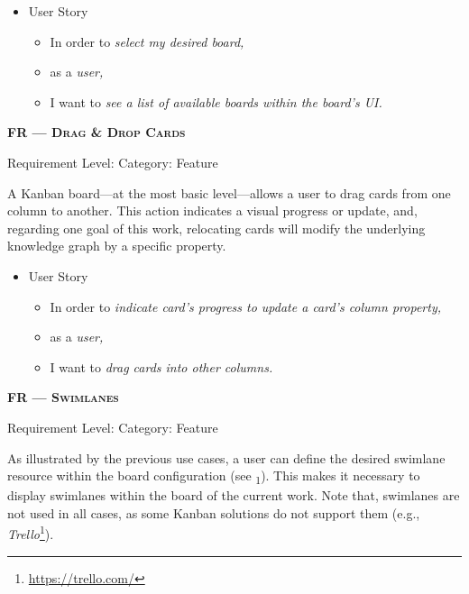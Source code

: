 \begin{itemize}[after=\vspace{1em}]
    \setlength\itemsep{-0.5em}
	\item[] User Story\\[-7.8mm]
	\begin{itemize}
    \setlength\itemsep{-0.5em}
        \item[] In order to \textit{select my desired board,}
        \item[] as a \textit{user,}
        \item[] I want to \textit{see a list of available boards within the board’s \acrshort*{UI}.}
    \end{itemize}
\end{itemize}






\centerline{\textbf{FR\textsubscript{} --- \textsc{Drag \& Drop Cards}}}

\centerline{\small Requirement Level:  \quad{} Category: Feature}

\noindent A Kanban board---at the most basic level---allows a user to drag cards from one column to another. This action indicates a visual progress or update, and, regarding one goal of this work, relocating cards will modify the underlying knowledge graph by a specific property.

\begin{itemize}[after=\vspace{1em}]
    \setlength\itemsep{-0.5em}
	\item[] User Story\\[-7.8mm]
	\begin{itemize}
    \setlength\itemsep{-0.5em}
        \item[] In order to \textit{indicate card’s progress  to update a card’s column property,}
        \item[] as a \textit{user,}
        \item[] I want to \textit{drag cards into other columns.}
    \end{itemize}
\end{itemize}


\centerline{\textbf{FR\textsubscript{} --- \textsc{Swimlanes}}}

\centerline{\small Requirement Level:  \quad{} Category: Feature}

\noindent As illustrated by the previous use cases, a user can define the desired swimlane resource within the board configuration (see \textsubscript{1}). This makes it necessary to display swimlanes within the board of the current work. Note that, swimlanes are not used in all cases, as some Kanban solutions do not support them (e.g., \textit{Trello}\footnote{\url{https://trello.com/}}).

